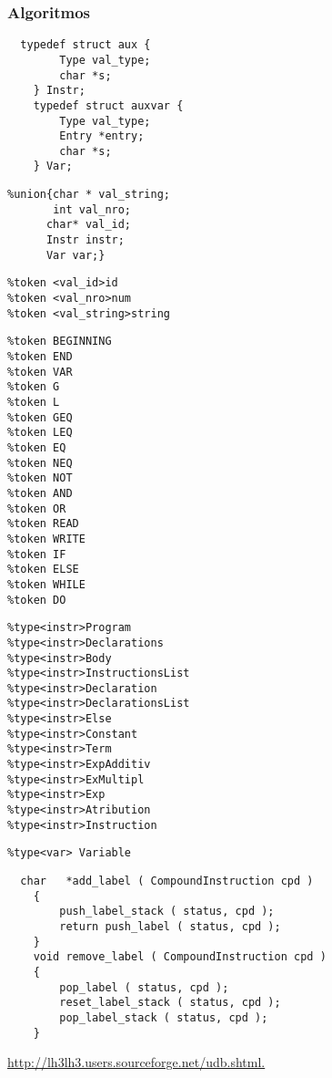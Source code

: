 \subsubsection{Algoritmos}
\label{subsec:subsubsection:algoritmos:desenho}










\newpage

\begin{verbatim}
  typedef struct aux {
        Type val_type;
        char *s;
    } Instr;
    typedef struct auxvar {
        Type val_type;
        Entry *entry;
        char *s;
    } Var;
\end{verbatim}




\newpage
\begin{verbatim}
%union{char * val_string; 
       int val_nro; 
      char* val_id;  
      Instr instr; 
      Var var;}
\end{verbatim}



\newpage
\begin{verbatim}
%token <val_id>id
%token <val_nro>num
%token <val_string>string
\end{verbatim}




\newpage
\begin{verbatim}
%token BEGINNING
%token END
%token VAR
%token G
%token L
%token GEQ
%token LEQ
%token EQ
%token NEQ
%token NOT
%token AND
%token OR
%token READ
%token WRITE
%token IF
%token ELSE
%token WHILE
%token DO
\end{verbatim}




\newpage
\begin{verbatim}
%type<instr>Program
%type<instr>Declarations
%type<instr>Body
%type<instr>InstructionsList
%type<instr>Declaration
%type<instr>DeclarationsList
%type<instr>Else
%type<instr>Constant
%type<instr>Term
%type<instr>ExpAdditiv
%type<instr>ExMultipl
%type<instr>Exp
%type<instr>Atribution
%type<instr>Instruction
\end{verbatim}


\newpage
\begin{verbatim}
%type<var> Variable
\end{verbatim}



\newpage
\begin{verbatim}
  char   *add_label ( CompoundInstruction cpd )
    {
        push_label_stack ( status, cpd );
        return push_label ( status, cpd );
    }
    void remove_label ( CompoundInstruction cpd )
    {
        pop_label ( status, cpd );
        reset_label_stack ( status, cpd );
        pop_label_stack ( status, cpd );
    }
\end{verbatim}



\url{http://lh3lh3.users.sourceforge.net/udb.shtml.}
